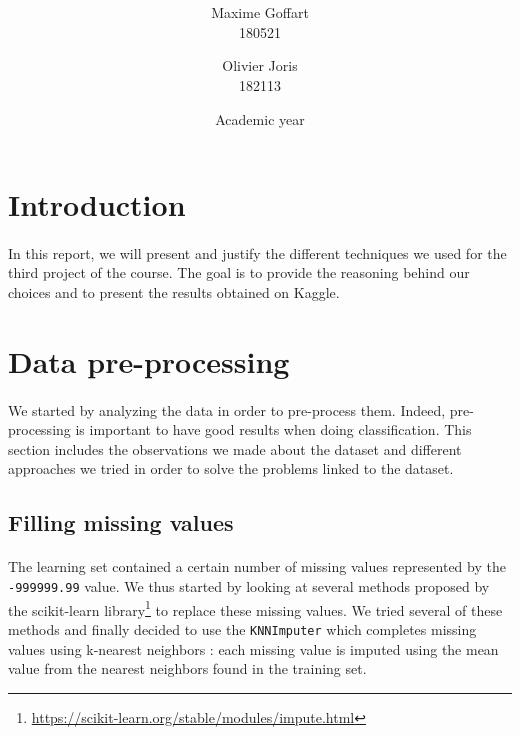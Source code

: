 \documentclass[a4paper, 11pt, oneside]{article}
\title{\ClassName\\\vspace*{0.8cm}\ProjectName\vspace{1cm}}
\author{Maxime Goffart \\180521 \and Olivier Joris\\182113}
\date{\vspace{1cm}Academic year \AcademicYear}
\begin{document}
\begin{titlingpage}
{\let\newpage\relax\maketitle}
\end{titlingpage}

\thispagestyle{empty}
\newpage


\tableofcontents
\newpage


\section{Introduction}
\paragraph{}In this report, we will present and justify the different techniques we used for the third project of the course. The goal is to provide the reasoning behind our choices and to present the results obtained on Kaggle.


\section{Data pre-processing}\label{sec:data-pre-process}
\paragraph{}We started by analyzing the data in order to pre-process them. Indeed, pre-processing is important
to have good results when doing classification. This section includes the observations we made about the dataset
and different approaches we tried in order to solve the problems linked to the dataset.

\subsection{Filling missing values}
\paragraph{}The learning set contained a certain number of missing values represented by the \texttt{-999999.99} value. We thus started by looking at several 
methods proposed by the scikit-learn library\footnote{\url{https://scikit-learn.org/stable/modules/impute.html}} to replace these missing values. We tried several of these methods and finally decided to use the \texttt{KNNImputer} which completes missing values using k-nearest neighbors : each missing value is imputed using the mean value from the nearest neighbors found in the training set. 
\end{document}

